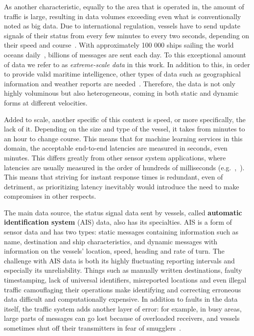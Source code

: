 As another characteristic, equally to the area that is operated in, the amount of traffic is large, resulting in data volumes exceeding even what is conventionally noted as big data. Due to international regulation, vessels have to send update signals of their status from every few minutes to every two seconds, depending on their speed and course~\cite{maritimeinformatics}. With approximately 100 000 ships sailing the world oceans daily~\cite{maritimeinformatics}, billions of messages are sent each day. To this exceptional amount of data we refer to as \textit{extreme-scale data} in this work. In addition to this, in order to provide valid maritime intelligence, other types of data such as geographical information and weather reports are needed~\cite{D1.1}. Therefore, the data is not only highly voluminous but also heterogeneous, coming in both static and dynamic forms at different velocities.

Added to scale, another specific of this context is speed, or more specifically, the lack of it. Depending on the size and type of the vessel, it takes from minutes to an hour to change course. This means that for machine learning services in this domain, the acceptable end-to-end latencies are measured in seconds, even minutes. This differs greatly from other sensor system applications, where latencies are usually measured in the order of hundreds of milliseconds (e.g.~\cite{facebook},~\cite{edgelatency}). This means that striving for instant response times is redundant, even of detriment, as prioritizing latency inevitably would introduce the need to make compromises in other respects.
\enlargethispage{7mm}

The main data source, the status signal data sent by vessels, called \textbf{automatic identification system} (AIS) data, also has its specialties. AIS is a form of sensor data and has two types: static messages containing information such as name, destination and ship characteristics, and dynamic messages with information on the vessels' location, speed, heading and rate of turn. The challenge with AIS data is both its highly fluctuating reporting intervals and especially its unreliability.  Things such as manually written destinations, faulty timestamping, lack of universal identifiers, misreported locations and even illegal traffic camouflaging their operations make identifying and correcting erroneous data difficult and computationally expensive. In addition to faults in the data itself, the traffic system adds another layer of error: for example, in busy areas, large parts of messages can go lost because of overloaded receivers, and vessels sometimes shut off their transmitters in fear of smugglers~\cite{maritimeinformatics}.

